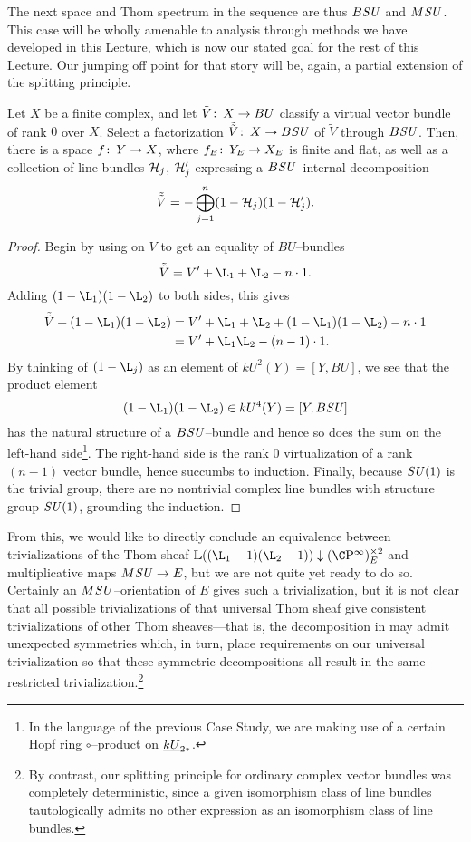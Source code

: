 The next space and Thom spectrum in the sequence are thus $B\mathit{SU}$ and $M\mathit{SU}$.  This case will be wholly amenable to analysis through methods we have developed in this Lecture, which is now our stated goal for the rest of this Lecture.  Our jumping off point for that story will be, again, a partial extension of the splitting principle.
\begin{lemma}\label{SplittingPrincipleForBSU}
Let $X$ be a finite complex, and let $\tilde V\colon\thinspace X \to BU$ classify a virtual vector bundle of rank $0$ over $X$.  Select a factorization $\tilde{\tilde V}\colon\thinspace X \to B\mathit{SU}$ of $\tilde V$ through $B\mathit{SU}$.  Then, there is a space $f\colon\thinspace Y \to X$, where $f_E\colon\thinspace Y_E \to X_E$ is finite and flat, as well as a collection of line bundles $\mathcal{H}_j$, $\mathcal{H}'_j$ expressing a $B\mathit{SU}$--internal decomposition \[\tilde{\tilde V} = -\bigoplus_{j=1}^n (1 - \mathcal{H}_j)(1 - \mathcal{H}'_j).\]
\end{lemma}
\begin{proof}
Begin by using  on $V$ to get an equality of $BU$--bundles \[\tilde{\tilde V} = V' + \L_1 + \L_2 - n \cdot 1.\]  Adding $(1 - \L_1)(1 - \L_2)$ to both sides, this gives
\begin{align*}
\tilde{\tilde V} + (1 - \L_1)(1 - \L_2) & = V' + \L_1 + \L_2 + (1 - \L_1)(1 - \L_2) - n \cdot 1 \\
& = V' + \L_1\L_2 - (n-1) \cdot 1.
\end{align*}
By thinking of $(1 - \L_j)$ as an element of $kU^2(Y) = [Y, BU]$, we see that the product element \[(1 - \L_1)(1 - \L_2) \in kU^4(Y) = [Y, B\SU]\] has the natural structure of a $B\mathit{SU}$--bundle and hence so does the sum on the left-hand side\footnote{In the language of the previous Case Study, we are making use of a certain Hopf ring $\circ$--product on $\underline{\smash{kU}}_{2*}$.}.  The right-hand side is the rank $0$ virtualization of a rank $(n-1)$ vector bundle, hence succumbs to induction.  Finally, because $\mathit{SU}(1)$ is the trivial group, there are no nontrivial complex line bundles with structure group $\mathit{SU}(1)$, grounding the induction.
\end{proof}

From this, we would like to directly conclude an equivalence between trivializations of the Thom sheaf $\ThomSheaf{(\L_1 - 1)(\L_2 - 1)} \downarrow (\CP^\infty)^{\times 2}_E$ and multiplicative maps $M\mathit{SU} \to E$, but we are not quite yet ready to do so.  Certainly an $M\mathit{SU}$--orientation of $E$ gives such a trivialization, but it is not clear that all possible trivializations of that universal Thom sheaf give consistent trivializations of other Thom sheaves---that is, the decomposition in  may admit unexpected symmetries which, in turn, place requirements on our universal trivialization so that these symmetric decompositions all result in the same restricted trivialization.\footnote{By contrast, our splitting principle for ordinary complex vector bundles was completely deterministic, since a given isomorphism class of line bundles tautologically admits no other expression as an isomorphism class of line bundles.}

